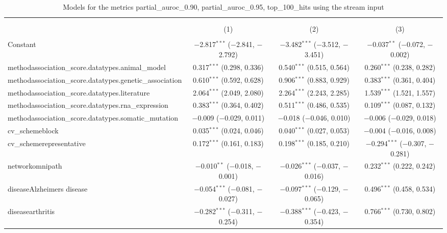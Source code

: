 
\begin{table}[!htbp] \centering 
  \caption{Models for the metrics partial_auroc_0.90, partial_auroc_0.95, top_100_hits using the stream input} 
  \label{} 
\begin{tabular}{@{\extracolsep{5pt}}lccc} 
\\[-1.8ex]\hline 
\hline \\[-1.8ex] 
\\[-1.8ex] & (1) & (2) & (3)\\ 
\hline \\[-1.8ex] 
 Constant & $-$2.817$^{***}$ ($-$2.841, $-$2.792) & $-$3.482$^{***}$ ($-$3.512, $-$3.451) & $-$0.037$^{**}$ ($-$0.072, $-$0.002) \\ 
  methodassociation\_score.datatypes.animal\_model & 0.317$^{***}$ (0.298, 0.336) & 0.540$^{***}$ (0.515, 0.564) & 0.260$^{***}$ (0.238, 0.282) \\ 
  methodassociation\_score.datatypes.genetic\_association & 0.610$^{***}$ (0.592, 0.628) & 0.906$^{***}$ (0.883, 0.929) & 0.383$^{***}$ (0.361, 0.404) \\ 
  methodassociation\_score.datatypes.literature & 2.064$^{***}$ (2.049, 2.080) & 2.264$^{***}$ (2.243, 2.285) & 1.539$^{***}$ (1.521, 1.557) \\ 
  methodassociation\_score.datatypes.rna\_expression & 0.383$^{***}$ (0.364, 0.402) & 0.511$^{***}$ (0.486, 0.535) & 0.109$^{***}$ (0.087, 0.132) \\ 
  methodassociation\_score.datatypes.somatic\_mutation & $-$0.009 ($-$0.029, 0.011) & $-$0.018 ($-$0.046, 0.010) & $-$0.006 ($-$0.029, 0.018) \\ 
  cv\_schemeblock & 0.035$^{***}$ (0.024, 0.046) & 0.040$^{***}$ (0.027, 0.053) & $-$0.004 ($-$0.016, 0.008) \\ 
  cv\_schemerepresentative & 0.172$^{***}$ (0.161, 0.183) & 0.198$^{***}$ (0.185, 0.210) & $-$0.294$^{***}$ ($-$0.307, $-$0.281) \\ 
  networkomnipath & $-$0.010$^{**}$ ($-$0.018, $-$0.001) & $-$0.026$^{***}$ ($-$0.037, $-$0.016) & 0.232$^{***}$ (0.222, 0.242) \\ 
  diseaseAlzheimers disease & $-$0.054$^{***}$ ($-$0.081, $-$0.027) & $-$0.097$^{***}$ ($-$0.129, $-$0.065) & 0.496$^{***}$ (0.458, 0.534) \\ 
  diseasearthritis & $-$0.282$^{***}$ ($-$0.311, $-$0.254) & $-$0.388$^{***}$ ($-$0.423, $-$0.354) & 0.766$^{***}$ (0.730, 0.802) \\ 

\end{tabular}
\end{table}
